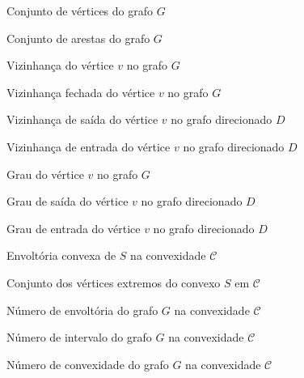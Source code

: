 
\begin{simbolos} \itemsep -1pt
	\item[$V(G)$] Conjunto de vértices do grafo $G$
	\item[$E(G)$] Conjunto de arestas do grafo $G$
	\item[$N_G(v)$] Vizinhança do vértice $v$ no grafo $G$
	\item[{\VizFec}] Vizinhança fechada do vértice $v$ no grafo $G$
	\item[$N^+_D(v)$] Vizinhança de saída do vértice $v$ no grafo direcionado $D$
	\item[$N^-_D(v)$] Vizinhança de entrada do vértice $v$ no grafo direcionado $D$
	\item[$d_G(v)$] Grau do vértice $v$ no grafo $G$
	\item[$d^+_D(v)$] Grau de saída do vértice $v$ no grafo direcionado $D$
	\item[$d^-_D(v)$] Grau de entrada do vértice $v$ no grafo direcionado $D$
    \item[$conv_\mathcal{C}(S)$] Envoltória convexa de $S$ na convexidade $\mathcal{C}$
    \item[$Ext_\mathcal{C}(S)$] Conjunto dos vértices extremos do convexo $S$ em $\mathcal{C}$
    \item[$hn_\mathcal{C}(G)$] Número de envoltória do grafo $G$ na convexidade $\mathcal{C}$
    \item[$in_\mathcal{C}(G)$] Número de intervalo do grafo $G$ na convexidade $\mathcal{C}$
    \item[$con_\mathcal{C}(G)$] Número de convexidade do grafo $G$ na convexidade $\mathcal{C}$
\end{simbolos}